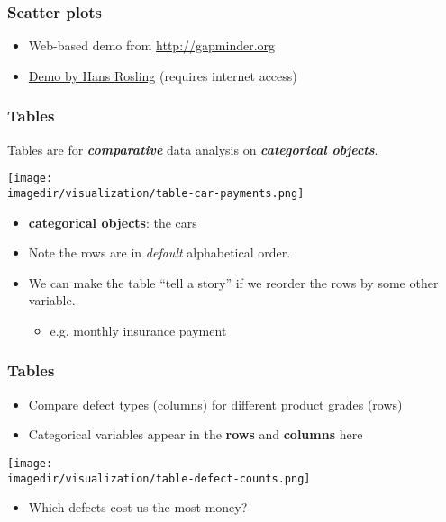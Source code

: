 \begin{frame}\frametitle{Scatter plots}
	\begin{itemize}
		\item	Web-based demo from \href{http://gapminder.org}{http://gapminder.org} 
		\item	\href{http://www.youtube.com/v/jbkSRLYSojo}{Demo by Hans Rosling} (requires internet access) 
	\end{itemize}
\end{frame}

\begin{frame}\frametitle{Tables}
	
	Tables are for \textbf{\emph{comparative}} data analysis on \textbf{\emph{categorical objects}}.
	\begin{center}
		\texttt{[image: \\imagedir/visualization/table-car-payments.png]}
	\end{center}
	\begin{itemize}
		\item	\textbf{categorical objects}: the cars
		\item	Note the rows are in \emph{default} alphabetical order. 
		\item	We can make the table ``tell a story'' if we reorder the rows by some other variable. 
		\begin{itemize}
			\item	e.g. monthly insurance payment 
		\end{itemize}
	\end{itemize}
\end{frame}

\begin{frame}\frametitle{Tables}
	\begin{itemize}
		\item	Compare defect types (columns) for different product grades (rows)
		\item	Categorical variables appear in the \textbf{rows} and \textbf{columns} here
	\end{itemize}
	\begin{center}
		\texttt{[image: \\imagedir/visualization/table-defect-counts.png]}
	\end{center}
	\vspace{-12pt}
	\begin{itemize}
		\item	Which defects cost us the most money? 
	\end{itemize}
\end{frame}

